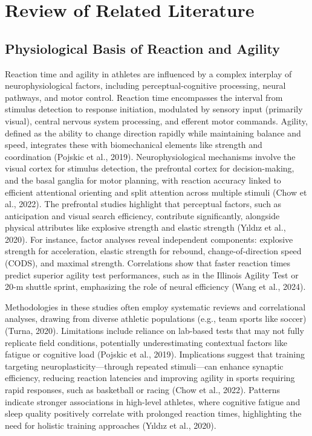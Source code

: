 \chapter{Review of Related Literature}
\label{sec:relatedlit}


\section{Physiological Basis of Reaction and Agility}

Reaction time and agility in athletes are influenced by a complex interplay of neurophysiological factors, including perceptual-cognitive processing, neural pathways, and motor control. Reaction time encompasses the interval from stimulus detection to response initiation, modulated by sensory input (primarily visual), central nervous system processing, and efferent motor commands. Agility, defined as the ability to change direction rapidly while maintaining balance and speed, integrates these with biomechanical elements like strength and coordination (Pojskic et al., 2019). Neurophysiological mechanisms involve the visual cortex for stimulus detection, the prefrontal cortex for decision-making, and the basal ganglia for motor planning, with reaction accuracy linked to efficient attentional orienting and split attention across multiple stimuli (Chow et al., 2022). The prefrontal studies highlight that perceptual factors, such as anticipation and visual search efficiency, contribute significantly, alongside physical attributes like explosive strength and elastic strength (Yıldız et al., 2020). For instance, factor analyses reveal independent components: explosive strength for acceleration, elastic strength for rebound, change-of-direction speed (CODS), and maximal strength. Correlations show that faster reaction times predict superior agility test performances, such as in the Illinois Agility Test or 20-m shuttle sprint, emphasizing the role of neural efficiency (Wang et al., 2024).

Methodologies in these studies often employ systematic reviews and correlational analyses, drawing from diverse athletic populations (e.g., team sports like soccer) (Turna, 2020). Limitations include reliance on lab-based tests that may not fully replicate field conditions, potentially underestimating contextual factors like fatigue or cognitive load (Pojskic et al., 2019). Implications suggest that training targeting neuroplasticity—through repeated stimuli—can enhance synaptic efficiency, reducing reaction latencies and improving agility in sports requiring rapid responses, such as basketball or racing (Chow et al., 2022). Patterns indicate stronger associations in high-level athletes, where cognitive fatigue and sleep quality positively correlate with prolonged reaction times, highlighting the need for holistic training approaches (Yıldız et al., 2020).


